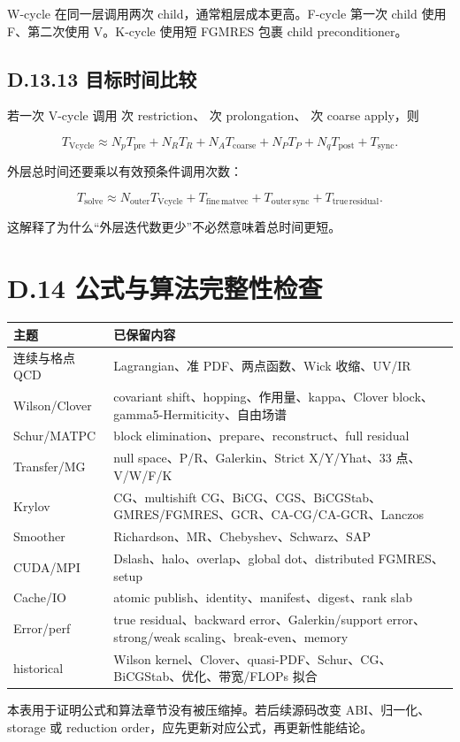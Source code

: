 \documentclass[UTF8,a4paper,10pt]{ctexart}
\DeclareRobustCommand{\pycode}[1]{\texorpdfstring{\texttt{\seqsplit{#1}}}{#1}}
\begin{document}
W-cycle 在同一层调用两次 child，通常粗层成本更高。F-cycle 第一次 child 使用 F、第二次使用 V。K-cycle 使用短 FGMRES 包裹 child preconditioner。

\subsection{D.13.13 目标时间比较}
若一次 V-cycle 调用 \pycode{N\_R} 次 restriction、\pycode{N\_P} 次 prolongation、\pycode{N\_A} 次 coarse apply，则

\begin{displaymath}
T_{\mathrm{Vcycle}} \approx N_pT_{\mathrm{pre}} +N_RT_R +N_AT_{\mathrm{coarse}} +N_PT_P +N_qT_{\mathrm{post}} +T_{\mathrm{sync}}.
\end{displaymath}

外层总时间还要乘以有效预条件调用次数：

\begin{displaymath}
T_{\mathrm{solve}} \approx N_{\mathrm{outer}}T_{\mathrm{Vcycle}} +T_{\mathrm{fine\,matvec}} +T_{\mathrm{outer\,sync}} +T_{\mathrm{true\,residual}}.
\end{displaymath}

这解释了为什么“外层迭代数更少”不必然意味着总时间更短。

\section{D.14 公式与算法完整性检查}
\begin{center}\small
\setlength{\tabcolsep}{2pt}
\begin{longtable}{@{}>{\raggedright\arraybackslash}p{}>{\raggedright\arraybackslash}p{}@{}}
\toprule
\textbf{主题} & \textbf{已保留内容} \\
\midrule\endhead
连续与格点 QCD & Lagrangian、准 PDF、两点函数、Wick 收缩、UV/IR \\
Wilson/Clover & covariant shift、hopping、作用量、kappa、Clover block、gamma5-Hermiticity、自由场谱 \\
Schur/MATPC & block elimination、prepare、reconstruct、full residual \\
Transfer/MG & null space、P/R、Galerkin、Strict X/Y/Yhat、33 点、V/W/F/K \\
Krylov & CG、multishift CG、BiCG、CGS、BiCGStab、GMRES/FGMRES、GCR、CA-CG/CA-GCR、Lanczos \\
Smoother & Richardson、MR、Chebyshev、Schwarz、SAP \\
CUDA/MPI & Dslash、halo、overlap、global dot、distributed FGMRES、setup \\
Cache/IO & atomic publish、identity、manifest、digest、rank slab \\
Error/perf & true residual、backward error、Galerkin/support error、strong/weak scaling、break-even、memory \\
508 historical & Wilson kernel、Clover、quasi-PDF、Schur、CG、BiCGStab、优化、带宽/FLOPs 拟合 \\
\bottomrule\end{longtable}
\end{center}
本表用于证明公式和算法章节没有被压缩掉。若后续源码改变 ABI、归一化、storage 或 reduction order，应先更新对应公式，再更新性能结论。
\end{document}
